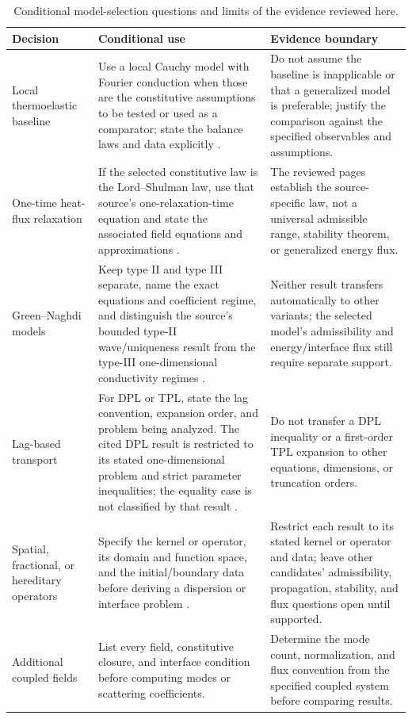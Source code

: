 \begin{table}[H]
\centering
\small
\caption{Conditional model-selection questions and limits of the evidence reviewed here.}
\label{tab:conditional_selection}
\begin{tabularx}{\textwidth}{@{}p{2.7cm}XX@{}}
\toprule
\textbf{Decision} & \textbf{Conditional use} & \textbf{Evidence boundary} \\
\midrule
Local thermoelastic baseline & Use a local Cauchy model with Fourier conduction when those are the constitutive assumptions to be tested or used as a comparator; state the balance laws and data explicitly \cite{Biot1956}. & Do not assume the baseline is inapplicable or that a generalized model is preferable; justify the comparison against the specified observables and assumptions. \\
One-time heat-flux relaxation & If the selected constitutive law is the Lord--Shulman law, use that source's one-relaxation-time equation and state the associated field equations and approximations \cite{Lord1967}. & The reviewed pages establish the source-specific law, not a universal admissible range, stability theorem, or generalized energy flux. \\
Green--Naghdi models & Keep type II and type III separate, name the exact equations and coefficient regime, and distinguish the source's bounded type-II wave/uniqueness result from the type-III one-dimensional conductivity regimes \cite{Green1993,GreenGN1992}. & Neither result transfers automatically to other variants; the selected model's admissibility and energy/interface flux still require separate support. \\
Lag-based transport & For DPL or TPL, state the lag convention, expansion order, and problem being analyzed. The cited DPL result is restricted to its stated one-dimensional problem and strict parameter inequalities; the equality case is not classified by that result \cite{Quintanilla2003DPL,RoyChoudhuri2007}. & Do not transfer a DPL inequality or a first-order TPL expansion to other equations, dimensions, or truncation orders. \\
Spatial, fractional, or hereditary operators & Specify the kernel or operator, its domain and function space, and the initial/boundary data before deriving a dispersion or interface problem \cite{Eringen1983}. & Restrict each result to its stated kernel or operator and data; leave other candidates' admissibility, propagation, stability, and flux questions open until supported. \\
Additional coupled fields & List every field, constitutive closure, and interface condition before computing modes or scattering coefficients. & Determine the mode count, normalization, and flux convention from the specified coupled system before comparing results. \\
\bottomrule
\end{tabularx}
\end{table}

